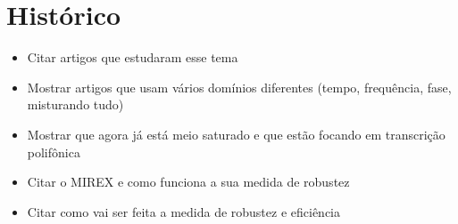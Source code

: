 \chapter{Histórico}
\label{cap:historico}

\begin{itemize}
\item Citar artigos que estudaram esse tema
\item Mostrar artigos que usam vários domínios diferentes (tempo, frequência, fase, misturando tudo)
\item Mostrar que agora já está meio saturado e que estão focando em transcrição polifônica
\item Citar o MIREX e como funciona a sua medida de robustez
\item Citar como vai ser feita a medida de robustez e eficiência
\end{itemize}



  
  
  
  
  